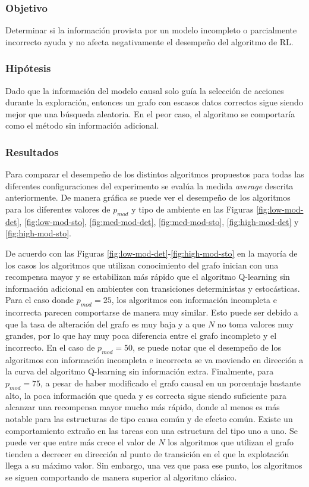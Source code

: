 \subsubsection{Objetivo}

Determinar si la información provista por un modelo
incompleto o parcialmente incorrecto ayuda y no
afecta negativamente el desempeño del algoritmo de RL.

\subsubsection{Hipótesis}

Dado que la información del modelo causal solo guía la selección
de acciones durante la exploración, entonces un grafo con escasos
datos correctos sigue siendo mejor que una búsqueda aleatoria. En el
peor caso, el algoritmo se comportaría como el método sin información adicional.


\subsubsection{Resultados}

Para comparar el desempeño de los distintos algoritmos propuestos
para todas las diferentes configuraciones del experimento
se evalúa la medida \textit{average} descrita anteriormente.
De manera gráfica se puede ver el desempeño de los algoritmos
para los diferentes valores de $p_{mod}$ y tipo de ambiente en las Figuras \ref{fig:low-mod-det}, \ref{fig:low-mod-sto}, \ref{fig:med-mod-det}, \ref{fig:med-mod-sto},  \ref{fig:high-mod-det} y \ref{fig:high-mod-sto}.

De acuerdo con las Figuras \ref{fig:low-mod-det}-\ref{fig:high-mod-sto}
en la mayoría de los casos los algoritmos que utilizan conocimiento del grafo inician con una recompensa mayor y se estabilizan más rápido que el algoritmo Q-learning
sin información adicional en ambientes con transiciones deterministas y estocásticas. Para el caso donde $p_{mod} = 25$, los algoritmos con información incompleta e incorrecta parecen 
comportarse de manera muy similar. Esto puede ser debido 
a que la tasa de alteración del grafo es muy baja y  a que $N$ no toma
valores muy grandes, por lo que hay muy poca diferencia entre el grafo incompleto y el incorrecto. 
En el caso de $p_{mod} = 50$, se
puede notar que el desempeño de los algoritmos
con información incompleta e incorrecta se 
va moviendo en dirección a la curva del algoritmo
Q-learning sin información extra.
Finalmente, para $p_{mod} = 75$,  a pesar de haber modificado el grafo 
causal en un porcentaje bastante alto, la poca información que queda y es correcta sigue siendo suficiente para alcanzar una recompensa mayor mucho más rápido, donde al menos es más notable para las estructuras de tipo causa común y de efecto común.
Existe un comportamiento extraño en las tareas con una estructura del tipo uno a uno. Se puede ver que entre más crece el valor de $N$ los algoritmos que utilizan el grafo tienden a decrecer en dirección al punto de transición en el que la explotación llega a su máximo valor. Sin embargo, una vez que pasa ese punto, los algoritmos se siguen comportando de manera superior al algoritmo clásico.


